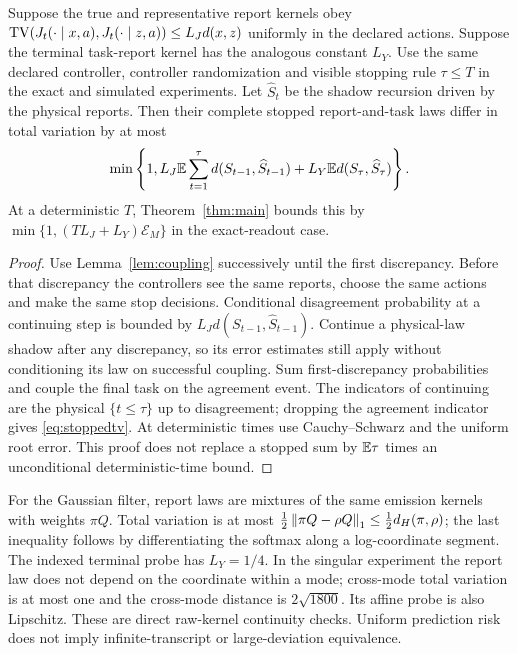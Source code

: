 \begin{proposition}\label{prop:report}
Suppose the true and representative report kernels obey
$\operatorname{TV}(J_t(\cdot\mid x,a),J_t(\cdot\mid z,a))\le L_Jd(x,z)$
uniformly in the declared actions. Suppose the terminal task-report kernel has the analogous constant $L_Y$. Use the same declared controller, controller randomization and visible stopping rule $\tau\le T$ in the exact and simulated experiments. Let $\widehat S_t$ be the shadow recursion driven by the physical reports. Then their complete stopped report-and-task laws differ in total variation by at most
\begin{equation}\label{eq:stoppedtv}
 \min\left\{1,
 L_J\mathbb E\sum_{t=1}^{\tau}d(S_{t-1},\widehat S_{t-1})
 +L_Y\mathbb E d(S_\tau,\widehat S_\tau)\right\}.
\end{equation}
At a deterministic $T$, Theorem~\ref{thm:main} bounds this by
$\min\{1,(TL_J+L_Y)\mathcal E_M\}$ in the exact-readout case.
\end{proposition}
\begin{proof}
Use Lemma~\ref{lem:coupling} successively until the first discrepancy. Before that discrepancy the controllers see the same reports, choose the same actions and make the same stop decisions. Conditional disagreement probability at a continuing step is bounded by $L_Jd(S_{t-1},\widehat S_{t-1})$. Continue a physical-law shadow after any discrepancy, so its error estimates still apply without conditioning its law on successful coupling. Sum first-discrepancy probabilities and couple the final task on the agreement event. The indicators of continuing are the physical $\{t\le\tau\}$ up to disagreement; dropping the agreement indicator gives \eqref{eq:stoppedtv}. At deterministic times use Cauchy--Schwarz and the uniform root error. This proof does not replace a stopped sum by $\mathbb E\tau$ times an unconditional deterministic-time bound.
\end{proof}

For the Gaussian filter, report laws are mixtures of the same emission kernels with weights $\pi Q$. Total variation is at most $\tfrac12\left\lVert\pi Q-\rho Q\right\rVert_1\le\tfrac12 d_H(\pi,\rho)$; the last inequality follows by differentiating the softmax along a log-coordinate segment. The indexed terminal probe has $L_Y=1/4$. In the singular experiment the report law does not depend on the coordinate within a mode; cross-mode total variation is at most one and the cross-mode distance is $2\sqrt{1800}$. Its affine probe is also Lipschitz. These are direct raw-kernel continuity checks. Uniform prediction risk does not imply infinite-transcript or large-deviation equivalence.

